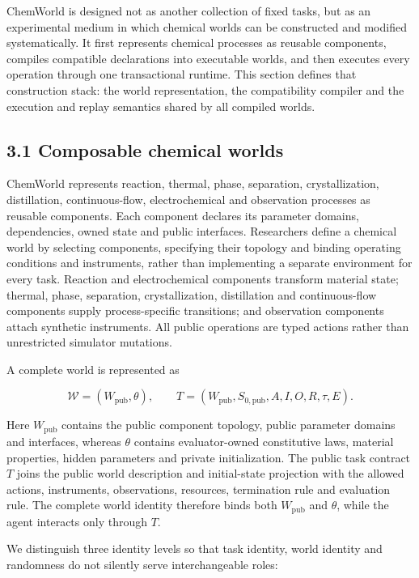 \documentclass[10pt,twocolumn]{article}
\begin{document}
ChemWorld is designed not as another collection of fixed tasks, but as
an experimental medium in which chemical worlds can be constructed and
modified systematically. It first represents chemical processes as
reusable components, compiles compatible declarations into executable
worlds, and then executes every operation through one transactional
runtime. This section defines that construction stack: the world
representation, the compatibility compiler and the execution and replay
semantics shared by all compiled worlds.

\subsection{3.1 Composable chemical
worlds}\label{composable-chemical-worlds}

ChemWorld represents reaction, thermal, phase, separation,
crystallization, distillation, continuous-flow, electrochemical and
observation processes as reusable components. Each component declares
its parameter domains, dependencies, owned state and public interfaces.
Researchers define a chemical world by selecting components, specifying
their topology and binding operating conditions and instruments, rather
than implementing a separate environment for every task. Reaction and
electrochemical components transform material state; thermal, phase,
separation, crystallization, distillation and continuous-flow components
supply process-specific transitions; and observation components attach
synthetic instruments. All public operations are typed actions rather
than unrestricted simulator mutations.

A complete world is represented as

\[
\mathcal{W}=(W_{\mathrm{pub}},\theta),\qquad
T=(W_{\mathrm{pub}},S_{0,\mathrm{pub}},A,I,O,R,\tau,E).
\]

Here \(W_{\mathrm{pub}}\) contains the public component topology, public
parameter domains and interfaces, whereas \(\theta\) contains
evaluator-owned constitutive laws, material properties, hidden
parameters and private initialization. The public task contract \(T\)
joins the public world description and initial-state projection with the
allowed actions, instruments, observations, resources, termination rule
and evaluation rule. The complete world identity therefore binds both
\(W_{\mathrm{pub}}\) and \(\theta\), while the agent interacts only
through \(T\).

We distinguish three identity levels so that task identity, world
identity and randomness do not silently serve interchangeable roles:
\end{document}
